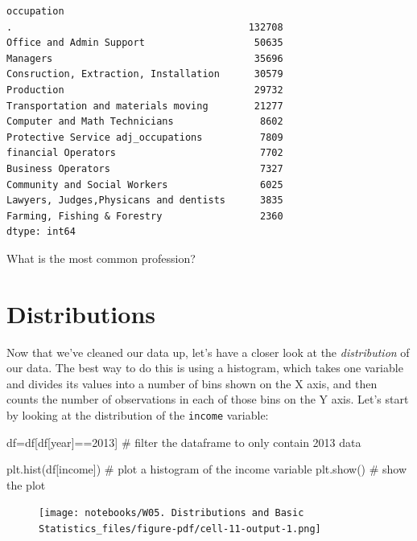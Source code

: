 \documentclass[
  letterpaper,
  DIV=11,
  numbers=noendperiod]{scrreprt}
\newenvironment{Shaded}{\begin{snugshade}}{\end{snugshade}}
\newcommand{\CommentTok}[1]{\textcolor[rgb]{0.37,0.37,0.37}{#1}}
\newcommand{\DecValTok}[1]{\textcolor[rgb]{0.68,0.00,0.00}{#1}}
\newcommand{\NormalTok}[1]{\textcolor[rgb]{0.00,0.23,0.31}{#1}}
\newcommand{\OperatorTok}[1]{\textcolor[rgb]{0.37,0.37,0.37}{#1}}
\newcommand{\StringTok}[1]{\textcolor[rgb]{0.13,0.47,0.30}{#1}}
\begin{document}
\begin{verbatim}
occupation
.                                         132708
Office and Admin Support                   50635
Managers                                   35696
Consruction, Extraction, Installation      30579
Production                                 29732
Transportation and materials moving        21277
Computer and Math Technicians               8602
Protective Service adj_occupations          7809
financial Operators                         7702
Business Operators                          7327
Community and Social Workers                6025
Lawyers, Judges,Physicans and dentists      3835
Farming, Fishing & Forestry                 2360
dtype: int64
\end{verbatim}

What is the most common profession?


\hypertarget{distributions}{%
\chapter{Distributions}\label{distributions}}

Now that we've cleaned our data up, let's have a closer look at the
\emph{distribution} of our data. The best way to do this is using a
histogram, which takes one variable and divides its values into a number
of bins shown on the X axis, and then counts the number of observations
in each of those bins on the Y axis. Let's start by looking at the
distribution of the \texttt{income} variable:

\begin{Shaded}
\begin{Highlighting}[]
\NormalTok{df}\OperatorTok{=}\NormalTok{df[df[}\StringTok{\textquotesingle{}year\textquotesingle{}}\NormalTok{]}\OperatorTok{==}\DecValTok{2013}\NormalTok{] }\CommentTok{\# filter the dataframe to only contain 2013 data}

\NormalTok{plt.hist(df[}\StringTok{\textquotesingle{}income\textquotesingle{}}\NormalTok{]) }\CommentTok{\# plot a histogram of the income variable}
\NormalTok{plt.show() }\CommentTok{\# show the plot}
\end{Highlighting}
\end{Shaded}

\begin{figure}[H]

{\centering \texttt{[image: notebooks/W05. Distributions and Basic Statistics\_files/figure-pdf/cell-11-output-1.png]}

}

\end{figure}
\end{document}
